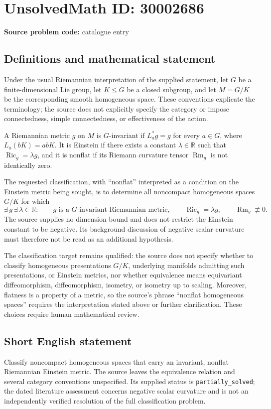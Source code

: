 \documentclass[11pt]{article}
\newcommand{\R}{\mathbb{R}}
\begin{document}
\section*{UnsolvedMath ID: 30002686}
\textbf{Source problem code:} catalogue entry
\subsection{Definitions and mathematical statement}
Under the usual Riemannian interpretation of the supplied statement, let \(G\) be a finite-dimensional Lie group, let \(K\leq G\) be a closed subgroup, and let \(M=G/K\) be the corresponding smooth homogeneous space. These conventions explicate the terminology; the source does not explicitly specify the category or impose connectedness, simple connectedness, or effectiveness of the action.

A Riemannian metric \(g\) on \(M\) is \(G\)-invariant if \(L_a^*g=g\) for every \(a\in G\), where \(L_a(bK)=abK\). It is Einstein if there exists a constant \(\lambda\in\R\) such that \(\operatorname{Ric}_g=\lambda g\), and it is nonflat if its Riemann curvature tensor \(\operatorname{Rm}_g\) is not identically zero.

The requested classification, with ``nonflat'' interpreted as a condition on the Einstein metric being sought, is to determine all noncompact homogeneous spaces \(G/K\) for which
\[
\exists\,g\ \exists\,\lambda\in\R:\qquad
 g\text{ is a }G\text{-invariant Riemannian metric},\qquad
 \operatorname{Ric}_g=\lambda g,\qquad
 \operatorname{Rm}_g\not\equiv0.
\]
The source supplies no dimension bound and does not restrict the Einstein constant to be negative. Its background discussion of negative scalar curvature must therefore not be read as an additional hypothesis.

The classification target remains qualified: the source does not specify whether to classify homogeneous presentations \(G/K\), underlying manifolds admitting such presentations, or Einstein metrics, nor whether equivalence means equivariant diffeomorphism, diffeomorphism, isometry, or isometry up to scaling. Moreover, flatness is a property of a metric, so the source's phrase ``nonflat homogeneous spaces'' requires the interpretation stated above or further clarification. These choices require human mathematical review.
\subsection{Short English statement}
Classify noncompact homogeneous spaces that carry an invariant, nonflat Riemannian Einstein metric. The source leaves the equivalence relation and several category conventions unspecified. Its supplied status is \texttt{partially\_solved}; the dated literature assessment concerns negative scalar curvature and is not an independently verified resolution of the full classification problem.
\end{document}
